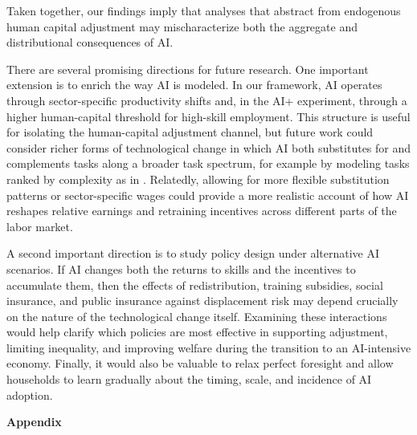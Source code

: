 \documentclass[12pt,english]{article}
\numberwithin{equation}{section}
\begin{document}
Taken together, our findings imply that analyses that abstract from endogenous human capital adjustment may mischaracterize both the aggregate and distributional consequences of AI. 

There are several promising directions for future research. One important extension is to enrich the way AI is modeled. In our framework, AI operates through sector-specific productivity shifts and, in the AI+ experiment, through a higher human-capital threshold for high-skill employment. This structure is useful for isolating the human-capital adjustment channel, but future work could consider richer forms of technological change in which AI both substitutes for and complements tasks along a broader task spectrum, for example by modeling tasks ranked by complexity as in \citet{Korinek2024}. Relatedly, allowing for more flexible substitution patterns or sector-specific wages could provide a more realistic account of how AI reshapes relative earnings and retraining incentives across different parts of the labor market.

A second important direction is to study policy design under alternative AI scenarios. If AI changes both the returns to skills and the incentives to accumulate them, then the effects of redistribution, training subsidies, social insurance, and public insurance against displacement risk may depend crucially on the nature of the technological change itself. Examining these interactions would help clarify which policies are most effective in supporting adjustment, limiting inequality, and improving welfare during the transition to an AI-intensive economy. Finally, it would also be valuable to relax perfect foresight and allow households to learn gradually about the timing, scale, and incidence of AI adoption.



\printbibliography



\appendix
\renewcommand{\theequation}{\thesection.\arabic{equation}}
\makeatletter
{}
\makeatother

\renewcommand{\thefigure}{\thesection.\arabic{figure}}
\makeatletter
{}
\makeatother

\clearpage
\begin{center}
    {\LARGE \textbf{Appendix}}
\end{center}
\end{document}
